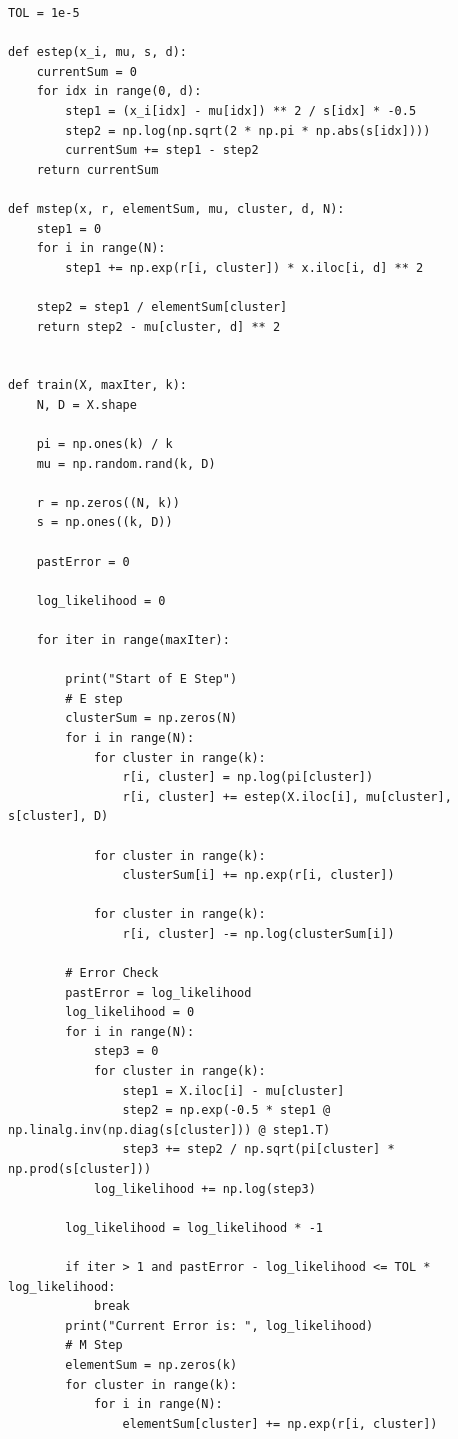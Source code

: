 \documentclass{article}
\begin{document}
\begin{titlepage}
\begin{lstlisting}
TOL = 1e-5

def estep(x_i, mu, s, d):
    currentSum = 0
    for idx in range(0, d):
        step1 = (x_i[idx] - mu[idx]) ** 2 / s[idx] * -0.5
        step2 = np.log(np.sqrt(2 * np.pi * np.abs(s[idx])))
        currentSum += step1 - step2
    return currentSum

def mstep(x, r, elementSum, mu, cluster, d, N):
    step1 = 0
    for i in range(N):
        step1 += np.exp(r[i, cluster]) * x.iloc[i, d] ** 2

    step2 = step1 / elementSum[cluster]
    return step2 - mu[cluster, d] ** 2


def train(X, maxIter, k):
    N, D = X.shape

    pi = np.ones(k) / k
    mu = np.random.rand(k, D)

    r = np.zeros((N, k))
    s = np.ones((k, D))

    pastError = 0

    log_likelihood = 0

    for iter in range(maxIter):

        print("Start of E Step")
        # E step
        clusterSum = np.zeros(N)
        for i in range(N):
            for cluster in range(k):
                r[i, cluster] = np.log(pi[cluster])
                r[i, cluster] += estep(X.iloc[i], mu[cluster], s[cluster], D)

            for cluster in range(k):
                clusterSum[i] += np.exp(r[i, cluster])

            for cluster in range(k):
                r[i, cluster] -= np.log(clusterSum[i])

        # Error Check
        pastError = log_likelihood
        log_likelihood = 0
        for i in range(N):
            step3 = 0
            for cluster in range(k):
                step1 = X.iloc[i] - mu[cluster]
                step2 = np.exp(-0.5 * step1 @ np.linalg.inv(np.diag(s[cluster])) @ step1.T)
                step3 += step2 / np.sqrt(pi[cluster] * np.prod(s[cluster]))
            log_likelihood += np.log(step3)

        log_likelihood = log_likelihood * -1

        if iter > 1 and pastError - log_likelihood <= TOL * log_likelihood:
            break
        print("Current Error is: ", log_likelihood)
        # M Step
        elementSum = np.zeros(k)
        for cluster in range(k):
            for i in range(N):
                elementSum[cluster] += np.exp(r[i, cluster])


\end{lstlisting}
\end{titlepage}
\end{document}
